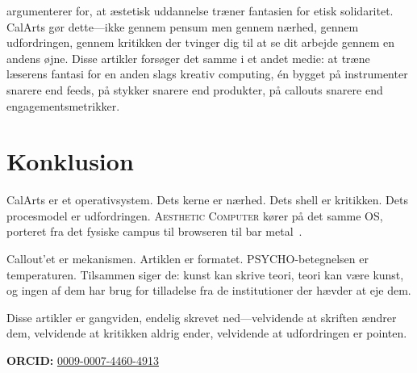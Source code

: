 \documentclass[10pt,letterpaper,twocolumn]{article}
\newcommand{\ac}{\textsc{Aesthetic Computer}}
\begin{document}
\citet{spivak2012aesthetic} argumenterer for, at æstetisk uddannelse træner fantasien for etisk solidaritet. CalArts gør dette---ikke gennem pensum men gennem nærhed, gennem udfordringen, gennem kritikken der tvinger dig til at se dit arbejde gennem en andens øjne. Disse artikler forsøger det samme i et andet medie: at træne læserens fantasi for en anden slags kreativ computing, én bygget på instrumenter snarere end feeds, på stykker snarere end produkter, på callouts snarere end engagementsmetrikker.

\section{Konklusion}

CalArts er et operativsystem. Dets kerne er nærhed. Dets shell er kritikken. Dets procesmodel er udfordringen. \ac{} kører på det samme OS, porteret fra det fysiske campus til browseren til bar metal~\citep{scudder2026ac, scudder2026os}.

Callout'et er mekanismen. Artiklen er formatet. PSYCHO-betegnelsen er temperaturen. Tilsammen siger de: kunst kan skrive teori, teori kan være kunst, og ingen af dem har brug for tilladelse fra de institutioner der hævder at eje dem.

Disse artikler er gangviden, endelig skrevet ned---velvidende at skriften ændrer dem, velvidende at kritikken aldrig ender, velvidende at udfordringen er pointen.

\vspace{0.5em}
\noindent\textbf{ORCID:} \href{https://orcid.org/0009-0007-4460-4913}{0009-0007-4460-4913}



\end{document}
